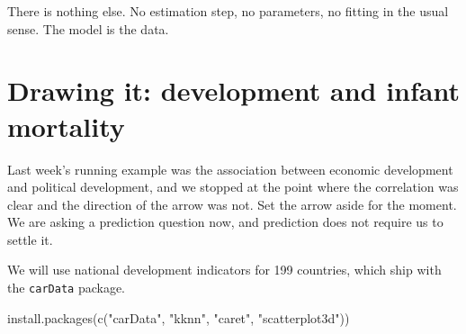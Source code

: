 \documentclass[
  a4paper,
]{scrbook}
\newenvironment{Shaded}{\begin{snugshade}}{\end{snugshade}}
\newcommand{\AttributeTok}[1]{\textcolor[rgb]{0.40,0.45,0.13}{#1}}
\newcommand{\CommentTok}[1]{\textcolor[rgb]{0.37,0.37,0.37}{#1}}
\newcommand{\DecValTok}[1]{\textcolor[rgb]{0.68,0.00,0.00}{#1}}
\newcommand{\DocumentationTok}[1]{\textcolor[rgb]{0.37,0.37,0.37}{\textit{#1}}}
\newcommand{\FunctionTok}[1]{\textcolor[rgb]{0.28,0.35,0.67}{#1}}
\newcommand{\NormalTok}[1]{\textcolor[rgb]{0.00,0.23,0.31}{#1}}
\newcommand{\OtherTok}[1]{\textcolor[rgb]{0.00,0.23,0.31}{#1}}
\newcommand{\SpecialCharTok}[1]{\textcolor[rgb]{0.37,0.37,0.37}{#1}}
\newcommand{\StringTok}[1]{\textcolor[rgb]{0.13,0.47,0.30}{#1}}
\begin{document}
There is nothing else. No estimation step, no parameters, no fitting in
the usual sense. The model is the data.

\chapter{Drawing it: development and infant
mortality}\label{drawing-it-development-and-infant-mortality}

Last week's running example was the association between economic
development and political development, and we stopped at the point where
the correlation was clear and the direction of the arrow was not. Set
the arrow aside for the moment. We are asking a prediction question now,
and prediction does not require us to settle it.

We will use national development indicators for 199 countries, which
ship with the \texttt{carData} package.

\begin{Shaded}
\begin{Highlighting}[]
\FunctionTok{install.packages}\NormalTok{(}\FunctionTok{c}\NormalTok{(}\StringTok{"carData"}\NormalTok{, }\StringTok{"kknn"}\NormalTok{, }\StringTok{"caret"}\NormalTok{, }\StringTok{"scatterplot3d"}\NormalTok{))}
\end{Highlighting}
\end{Shaded}

\begin{Shaded}
\end{Shaded}
\end{document}

